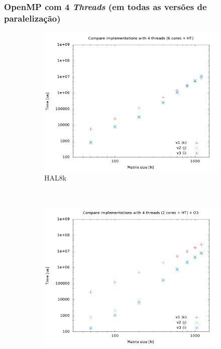 \documentclass[a4paper, 12pt]{article}
\begin{document}
\subsubsection{OpenMP com 4 \textit{Threads} (em todas as versões de paralelização)}
\begin{figure}[H]
    \centering
    \begin{subfigure}[H]{0.5\textwidth}
        \includegraphics[width=\textwidth]{HAL_cmp_versions-4t}
        \caption{HAL8k}
        \label{fig:8k_cmp_2t}
    \end{subfigure}%
    ~ %
    \begin{subfigure}[H]{0.5\textwidth}
        \includegraphics[width=\textwidth]{hpops2_O3_cmp_versions-4t}

\end{subfigure}
\end{figure}
\end{document}
